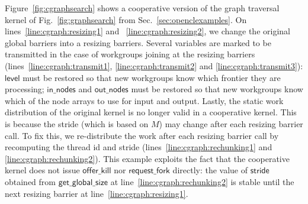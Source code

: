 \documentclass[parskip=half,sigconf,review, anonymous=true, acmcopyrightmode=none]{acmart}
\newcommand{\myfig}{Fig.~}
\newcommand{\myfiglong}{Figure~}
\newcommand{\mysec}{Sec.~}
\newcommand{\offerfork}{\mathsf{request\_fork}}
\newcommand{\offerkill}{\mathsf{offer\_kill}}
\newcommand{\getglobalsize}{\mathsf{get\_global\_size}}
\newcommand{\keyword}[1]{\mathsf{#1}}
\begin{document}

\myfiglong\ref{fig:cgraphsearch} shows a cooperative version of the
graph traversal kernel of \myfig\ref{fig:graphsearch} from
\mysec\ref{sec:openclexamples}.  On lines~\ref{line:cgraph:resizing1}
and ~\ref{line:cgraph:resizing2}, we change the original global
barriers into a resizing barriers. Several variables are marked to be
transmitted in the case of workgroups joining at the resizing barriers
(lines~\ref{line:cgraph:transmit1}, \ref{line:cgraph:transmit2} and
\ref{line:cgraph:transmit3}): $\keyword{level}$ must be restored so
that new workgroups know which frontier they are processing;
$\keyword{in\_nodes}$ and $\keyword{out\_nodes}$ must be restored so
that new workgroups know which of the node arrays to use for input and
output. Lastly, the static work distribution of the original kernel is
no longer valid in a cooperative kernel. This is because the stride
(which is based on $M$) may change after each resizing barrier
call. To fix this, we re-distribute the work after each resizing
barrier call by recomputing the thread id and stride
(lines~\ref{line:cgraph:rechunking1} and
\ref{line:cgraph:rechunking2}). This example exploits the fact that
the cooperative kernel does not issue $\offerkill$ nor $\offerfork$
directly: the value of $\keyword{stride}$ obtained from
$\getglobalsize$ at line~\ref{line:cgraph:rechunking2} is stable
until the next resizing barrier at line~\ref{line:cgraph:resizing1}.
\end{document}
